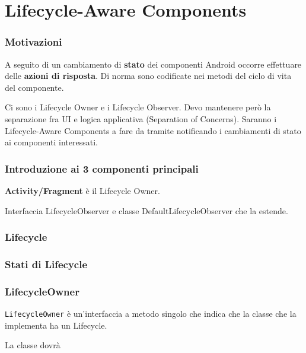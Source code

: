 
\section{Lifecycle-Aware Components}
\subsubsection{Motivazioni}
\par A seguito di un cambiamento di \textbf{stato} dei componenti Android occorre effettuare delle \textbf{azioni di risposta}. Di norma sono codificate nei metodi del ciclo di vita del componente.
\par Ci sono i Lifecycle Owner e i Lifecycle Observer. Devo mantenere però la separazione fra UI e logica applicativa (Separation of Concerns). Saranno i Lifecycle-Aware Components a fare da tramite notificando i cambiamenti di stato ai componenti interessati.


\subsubsection{Introduzione ai 3 componenti principali}
\par \textbf{Activity/Fragment} è il Lifecycle Owner.\\
\par Interfaccia LifecycleObserver e classe DefaultLifecycleObserver che la estende.

\subsubsection{Lifecycle}

\subsubsection{Stati di Lifecycle}

\subsubsection{LifecycleOwner}
\par \texttt{LifecycleOwner} è un'interfaccia a metodo singolo che indica che la classe che la implementa ha un Lifecycle.
\par La classe dovrà 

